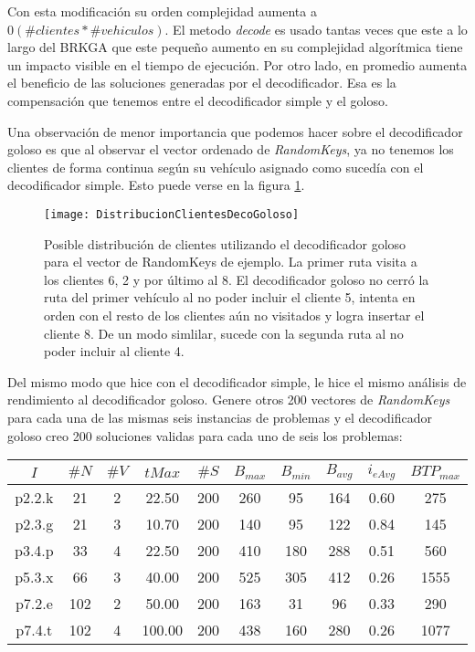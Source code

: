 \bigskip

Con esta modificación su orden complejidad aumenta a $0(\#clientes * \#vehiculos)$. El metodo \textit{decode} es usado tantas veces que este a lo largo del BRKGA que este pequeño aumento en su complejidad algorítmica tiene un impacto visible en el tiempo de ejecución. Por otro lado, en promedio aumenta el beneficio de las soluciones generadas por el decodificador. Esa es la compensación que tenemos entre el decodificador simple y el goloso. 

\bigskip

Una observación de menor importancia que podemos hacer sobre el decodificador goloso es que al observar el vector ordenado de \textit{RandomKeys}, ya no tenemos los clientes de forma continua según su vehículo asignado como sucedía con el decodificador simple. Esto puede verse en la figura \ref{fig:DistribucionClientesDecoGoloso}.

\begin{figure}[h]
	\caption{Posible distribución de clientes utilizando el decodificador goloso para el vector de RandomKeys de ejemplo. La primer ruta visita a los clientes 6, 2 y por último al 8. El decodificador goloso no cerró la ruta del primer vehículo al no poder incluir el cliente 5, intenta en orden con el resto de los clientes aún no visitados y logra insertar el cliente 8. De un modo simlilar, sucede con la segunda ruta al no poder incluir al cliente 4.}
	\centering
	\texttt{[image: DistribucionClientesDecoGoloso]}
	\label{fig:DistribucionClientesDecoGoloso}
\end{figure}

\bigskip

Del mismo modo que hice con el decodificador simple, le hice el mismo análisis de rendimiento al decodificador goloso. Genere otros 200 vectores de \textit{RandomKeys} para cada una de las mismas seis instancias de problemas y el decodificador goloso creo 200 soluciones validas para cada uno de seis los problemas:

\begin{center}
\begin{tabular}{ |c|c|c|c|c|c|c|c|c|c| } 
\hline
$I$ & $\#N$ & $\#V$ & $tMax$ & $\#S$ & $B_{max}$ & $B_{min}$ & $B_{avg}$ & $i_{eAvg}$ & $BTP_{max}$ \\
\hline
p2.2.k & 21 & 2 & 22.50 & 200 & 260 & 95 & 164 & 0.60 & 275   \\
p2.3.g & 21 & 3 & 10.70 & 200 & 140 & 95 & 122 & 0.84 & 145   \\
p3.4.p & 33 & 4 & 22.50 & 200 & 410 & 180 & 288 & 0.51 & 560   \\
p5.3.x & 66 & 3 & 40.00 & 200 & 525 & 305 & 412 & 0.26 & 1555   \\
p7.2.e & 102 & 2 & 50.00 & 200 & 163 & 31 & 96 & 0.33 & 290   \\
p7.4.t & 102 & 4 & 100.00 & 200 & 438 & 160 & 280 & 0.26 & 1077   \\
\hline
\end{tabular}
\end{center}

